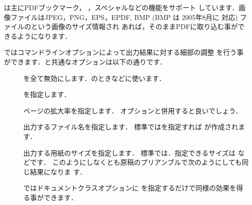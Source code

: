 %
%
%
%
%
%
%
\prog{\Dvipdfmx}は主に{PDFブックマーク}，
，{\Tpic}スペシャルなどの機能をサポート
しています．画像ファイルはJPEG，PNG，EPS，EPDF, BMP (BMP は 2005年8月に
対応) ファイルのという画像のサイズ情報され
あれば，そのままPDFに取り込む事ができるようになります．

\Dvipdfmx ではコマンドラインオプションによって出力結果に対する細部の調整
を行う事ができます．\Dvipdfm と共通なオプションは以下の通りです．

\begin{description}
\item[]
 を全て無効にします．のときなどに使います．
\item[ ]
%
 を指定します．
\item[ ]
%
%
 ページの拡大率を指定します．
 オプションと併用すると良いでしょう．
\item[ ]
 出力するファイル名を指定します．
 標準ではを指定すれば
 が作成されます．
\item[ ]
 出力する用紙のサイズを指定します．
標準では．指定できるサイズは
などです．
このようにしなくとも原稿のプリアンブルで次のようにしても同じ結果になりま
す．

\begin{InTeX}
\end{InTeX}

%
%
ではドキュメントクラスオプションに 
を指定するだけで同様の効果を得る事ができます．



\end{description}
